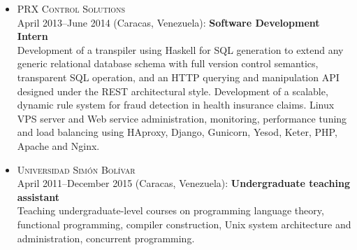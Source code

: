 \documentclass{res}
\begin{document}
\begin{resume}
\begin{itemize}[leftmargin=-0.3in]
    \item
      \textsc{PRX Control Solutions}
      \\ April 2013--June 2014 (Caracas, Venezuela): \textbf{Software Development Intern}
      \\ \small{Development of a transpiler using Haskell for SQL generation to extend any generic relational database schema with full version control semantics, transparent SQL operation, and an HTTP querying and manipulation API designed under the REST architectural style.  Development of a scalable, dynamic rule system for fraud detection in health insurance claims.  Linux VPS server and Web service administration, monitoring, performance tuning and load balancing using HAproxy, Django, Gunicorn, Yesod, Keter, PHP, Apache and Nginx.}


    \item
      \textsc{Universidad Sim\'on Bol\'{\i}var}
      \\ April 2011--December 2015 (Caracas, Venezuela): \textbf{Undergraduate teaching assistant}
      \\ \small{Teaching undergraduate-level courses on programming language theory, functional programming, compiler construction, Unix system architecture and administration, concurrent programming.}

  \end{itemize}

\end{resume}
\end{document}
